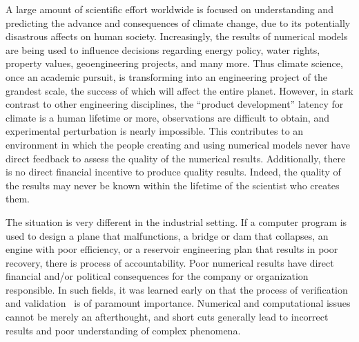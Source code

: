 A large amount of scientific effort worldwide is focused on understanding and predicting the advance and consequences of climate change, due to its potentially disastrous affects on human society.
Increasingly, the results of numerical models are being used to influence decisions regarding energy policy, water rights, property values, geoengineering projects, and many more.
Thus climate science, once an academic pursuit, is transforming into an engineering project of the grandest scale, the success of which will affect the entire planet.
However, in stark contrast to other engineering disciplines, the ``product development'' latency for climate is a human lifetime or more, observations are difficult to obtain, and experimental perturbation is nearly impossible.
This contributes to an environment in which the people creating and using numerical models never have direct feedback to assess the quality of the numerical results.
Additionally, there is no direct financial incentive to produce quality results.
Indeed, the quality of the results may never be known within the lifetime of the scientist who creates them.

The situation is very different in the industrial setting.
If a computer program is used to design a plane that malfunctions, a bridge or dam that collapses, an engine with poor efficiency, or a reservoir engineering plan that results in poor recovery, there is process of accountability.
Poor numerical results have direct financial and/or political consequences for the company or organization responsible.
In such fields, it was learned early on that the process of verification and validation~\cite{roache1998verification,babuska2004vav} is of paramount importance.
Numerical and computational issues cannot be merely an afterthought, and short cuts generally lead to incorrect results and poor understanding of complex phenomena.

